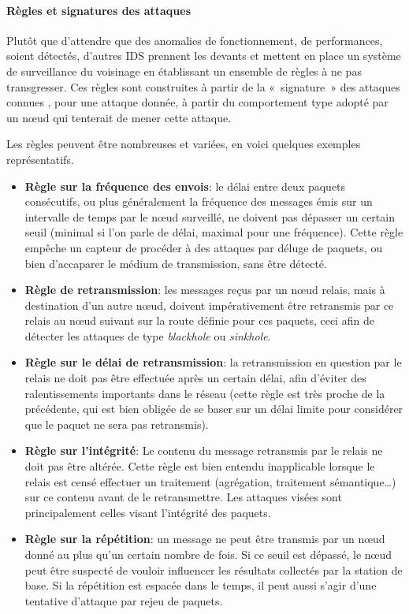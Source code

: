         \paragraph{Règles et signatures des attaques}
Plutôt que d'attendre que des anomalies de fonctionnement, de performances, soient détectés, d'autres IDS prennent les devants et mettent en place un système de surveillance du voisinage en établissant un ensemble de règles à ne pas transgresser.
Ces règles sont construites à partir de la « signature » des attaques connues \cad, pour une attaque donnée, à partir du comportement type adopté par un nœud qui tenterait de mener cette attaque.

Les règles peuvent être nombreuses et variées, en voici quelques exemples représentatifs.
\begin{itemize}
    \item \textbf{Règle sur la fréquence des envois}: le délai entre deux paquets consécutifs, ou plus généralement la fréquence des messages émis sur un intervalle de temps par le nœud surveillé, ne doivent pas dépasser un certain seuil (minimal si l'on parle de délai, maximal pour une fréquence). Cette règle empêche un capteur de procéder à des attaques par déluge de paquets, ou bien d'accaparer le médium de transmission, sans être détecté.
    \item \textbf{Règle de retransmission}: les messages reçus par un nœud relais, mais à destination d'un autre nœud, doivent impérativement être retransmis par ce relais au nœud suivant sur la route définie pour ces paquets, ceci afin de détecter les attaques de type \textit{blackhole} ou \textit{sinkhole}.
    \item \textbf{Règle sur le délai de retransmission}: la retransmission en question par le relais ne doit pas être effectuée après un certain délai, afin d'éviter des ralentissements importants dans le réseau (cette règle est très proche de la précédente, qui est bien obligée de se baser sur un délai limite pour considérer que le paquet ne sera pas retransmis).
    \item \textbf{Règle sur l'intégrité}: Le contenu du message retransmis par le relais ne doit pas être altérée. Cette règle est bien entendu inapplicable lorsque le relais est censé effectuer un traitement (agrégation, traitement sémantique\dots) sur ce contenu avant de le retransmettre. Les attaques visées sont principalement celles visant l'intégrité des paquets.
    \item \textbf{Règle sur la répétition}: un message ne peut être transmis par un nœud donné au plus qu'un certain nombre de fois. Si ce seuil est dépassé, le nœud peut être suspecté de vouloir influencer les résultats collectés par la station de base. Si la répétition est espacée dans le temps, il peut aussi s'agir d'une tentative d'attaque par rejeu de paquets.

\end{itemize}
